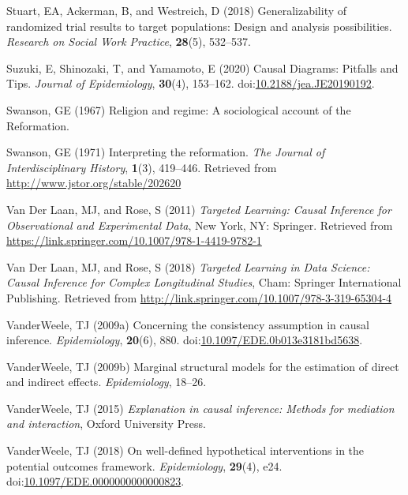 \documentclass[
  single column]{article}
\newlength{\cslhangindent}
\newenvironment{CSLReferences}[2] %
 {\begin{list}{}{%
  \setlength{\itemindent}{0pt}
  \setlength{\leftmargin}{0pt}
  \setlength{\parsep}{0pt}
  \ifodd #1
   \setlength{\leftmargin}{\cslhangindent}
   \setlength{\itemindent}{-1\cslhangindent}
  \fi
  \setlength{\itemsep}{#2\baselineskip}}}
 {\end{list}}
\begin{document}
\begin{CSLReferences}{1}{0}
Stuart, EA, Ackerman, B, and Westreich, D (2018) Generalizability of
randomized trial results to target populations: Design and analysis
possibilities. \emph{Research on Social Work Practice}, \textbf{28}(5),
532--537.

Suzuki, E, Shinozaki, T, and Yamamoto, E (2020) Causal Diagrams:
Pitfalls and Tips. \emph{Journal of Epidemiology}, \textbf{30}(4),
153--162.
doi:\href{https://doi.org/10.2188/jea.JE20190192}{10.2188/jea.JE20190192}.

Swanson, GE (1967) Religion and regime: A sociological account of the
{R}eformation.

Swanson, GE (1971) Interpreting the reformation. \emph{The Journal of
Interdisciplinary History}, \textbf{1}(3), 419--446. Retrieved from
\url{http://www.jstor.org/stable/202620}

Van Der Laan, MJ, and Rose, S (2011) \emph{Targeted Learning: Causal
Inference for Observational and Experimental Data}, New York, NY:
Springer. Retrieved from
\url{https://link.springer.com/10.1007/978-1-4419-9782-1}

Van Der Laan, MJ, and Rose, S (2018) \emph{Targeted Learning in Data
Science: Causal Inference for Complex Longitudinal Studies}, Cham:
Springer International Publishing. Retrieved from
\url{http://link.springer.com/10.1007/978-3-319-65304-4}

VanderWeele, TJ (2009a) Concerning the consistency assumption in causal
inference. \emph{Epidemiology}, \textbf{20}(6), 880.
doi:\href{https://doi.org/10.1097/EDE.0b013e3181bd5638}{10.1097/EDE.0b013e3181bd5638}.

VanderWeele, TJ (2009b) Marginal structural models for the estimation of
direct and indirect effects. \emph{Epidemiology}, 18--26.

VanderWeele, TJ (2015) \emph{Explanation in causal inference: Methods
for mediation and interaction}, Oxford University Press.

VanderWeele, TJ (2018) On well-defined hypothetical interventions in the
potential outcomes framework. \emph{Epidemiology}, \textbf{29}(4), e24.
doi:\href{https://doi.org/10.1097/EDE.0000000000000823}{10.1097/EDE.0000000000000823}.


\end{CSLReferences}
\end{document}
